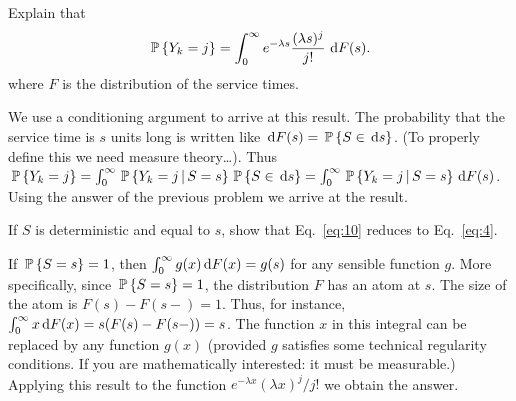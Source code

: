 \begin{question}
 Explain that 
\begin{equation}\label{eq:10}
  \P{Y_k = j} = \int_0^\infty e^{-\lambda s}\frac{(\lambda s)^j}{j!}\, \d F(s).
\end{equation}
where $F$ is the distribution of the service times.
\begin{solution}
  We use a conditioning argument to arrive at this result. The
    probability that the service time is $s$ units long is written
    like $\d F(s) = \P{S\in \d s}$. (To properly define this we need
    measure theory\ldots). Thus
    $\P{Y_k=j} = \int_0^\infty \P{Y_k =j\given S=s}\P{S\in \d s} =
    \int_0^\infty \P{Y_k =j\given S=s} \d F(s)$.
    Using the answer of the previous problem we arrive at the result.
\end{solution}
\end{question}

\begin{question}
 If $S$ is deterministic and equal to $s$, show that
  Eq.~\eqref{eq:10} reduces to Eq.~\eqref{eq:4}.
  \begin{solution}
    If $\P{S=s}=1$, then $\int_0^\infty g(x) \d F(x) = g(s)$ for any
    sensible function $g$. More specifically, since $\P{S=s}=1$, the
    distribution $F$ has an atom at $s$. The size of the atom is
    $F(s)-F(s-)=1$. Thus, for instance,
    $\int_0^\infty x \d F(x) = s (F(s)-F(s-)) =s$. The function $x$ in
    this integral can be replaced by any function $g(x)$ (provided $g$
    satisfies some technical regularity conditions. If you are
    mathematically interested: it must be measurable.)  Applying this
    result to the function $e^{-\lambda x}(\lambda x)^j/j!$ we obtain
    the answer.
  \end{solution}
\end{question}

